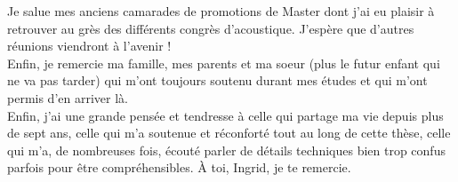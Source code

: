 Je salue mes anciens camarades de promotions de Master dont j'ai eu plaisir à retrouver au grès des différents congrès d'acoustique. J'espère que d'autres réunions viendront à l'avenir !\\

Enfin, je remercie ma famille, mes parents et ma soeur (plus le futur enfant qui ne va pas tarder) qui m'ont toujours soutenu durant mes études et qui m'ont permis d'en arriver là.\\

Enfin, j'ai une grande pensée et tendresse à celle qui partage ma vie depuis plus de sept ans, celle qui m'a soutenue et réconforté tout au long de cette thèse, celle qui m'a, de nombreuses fois, écouté parler de détails techniques bien trop confus parfois pour être compréhensibles. \`A toi, Ingrid, je te remercie.


